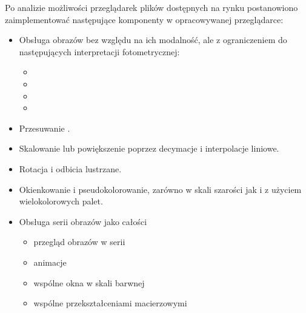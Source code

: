 
\par
Po analizie możliwości przeglądarek plików \DICOM dostępnych na rynku postanowiono zaimplementować następujące komponenty w opracowywanej przeglądarce:
\begin{itemize}
    \item Obsługa obrazów bez względu na ich modalność, ale z ograniczeniem do następujących interpretacji fotometrycznej:

          \begin{itemize}
              \item {}
              \item {}
              \item {}
              \item {}
          \end{itemize}

    \item Przesuwanie .

    \item Skalowanie lub powiększenie poprzez decymacje i interpolacje liniowe.

    \item Rotacja i odbicia lustrzane.

    \item Okienkowanie i pseudokolorowanie, zarówno w skali szarości jak i z użyciem wielokolorowych palet.

    \item Obsługa serii obrazów jako całości
          \begin{itemize}
              \item przegląd obrazów w serii
              \item animacje
              \item wspólne okna w skali barwnej
              \item wspólne przekształceniami macierzowymi
          \end{itemize}
\end{itemize}
